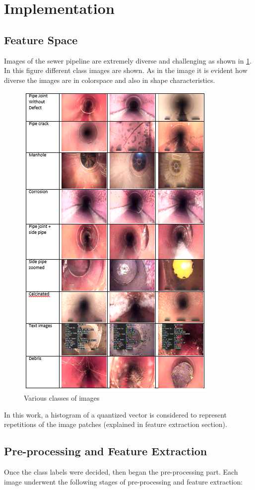 \documentclass[letterpaper,12pt, onecolumn]{article}%
\begin{document}
\section{Implementation} \label{sec:implementation}
\subsection{Feature Space}
\noindent
Images of the sewer pipeline are extremely diverse and challenging as shown in \cref{fig:pipeImages}. In this figure different class images are shown. As in the image it is evident how diverse the images are in colorspace and also in shape characteristics.
\begin{figure}[!hbtp]
 	  \centering
 	   \includegraphics[scale=1.3] {fig_pipeImgs.png} 
 	   \caption{Various classes of images}
       \label{fig:pipeImages}
\end{figure}
In this work, a histogram of a quantized vector is considered to represent repetitions of the image patches (explained in feature extraction section). 


\subsection{Pre-processing and Feature Extraction}
Once the class labels were decided, then began the pre-processing part. Each image underwent the following stages of pre-processing and feature extraction:
\end{document}
